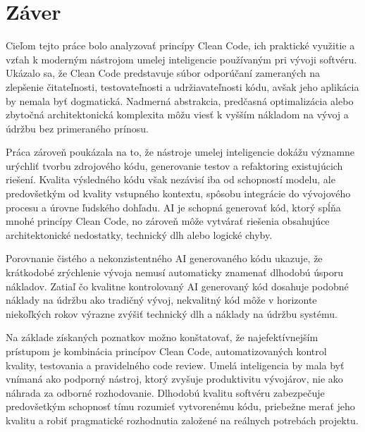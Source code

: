\section{Záver}

Cieľom tejto práce bolo analyzovať princípy Clean Code, ich praktické využitie a vzťah k moderným nástrojom umelej inteligencie používaným pri vývoji softvéru. Ukázalo sa, že Clean Code predstavuje súbor odporúčaní zameraných na zlepšenie čitateľnosti, testovateľnosti a udržiavateľnosti kódu, avšak jeho aplikácia by nemala byť dogmatická. Nadmerná abstrakcia, predčasná optimalizácia alebo zbytočná architektonická komplexita môžu viesť k vyšším nákladom na vývoj a údržbu bez primeraného prínosu.

Práca zároveň poukázala na to, že nástroje umelej inteligencie dokážu významne urýchliť tvorbu zdrojového kódu, generovanie testov a refaktoring existujúcich riešení. Kvalita výsledného kódu však nezávisí iba od schopností modelu, ale predovšetkým od kvality vstupného kontextu, spôsobu integrácie do vývojového procesu a úrovne ľudského dohľadu. AI je schopná generovať kód, ktorý spĺňa mnohé princípy Clean Code, no zároveň môže vytvárať riešenia obsahujúce architektonické nedostatky, technický dlh alebo logické chyby.

Porovnanie čistého a nekonzistentného AI generovaného kódu ukazuje, že krátkodobé zrýchlenie vývoja nemusí automaticky znamenať dlhodobú úsporu nákladov. Zatiaľ čo kvalitne kontrolovaný AI generovaný kód dosahuje podobné náklady na údržbu ako tradičný vývoj, nekvalitný kód môže v horizonte niekoľkých rokov výrazne zvýšiť technický dlh a náklady na údržbu systému.

Na základe získaných poznatkov možno konštatovať, že najefektívnejším prístupom je kombinácia princípov Clean Code, automatizovaných kontrol kvality, testovania a pravidelného code review. Umelá inteligencia by mala byť vnímaná ako podporný nástroj, ktorý zvyšuje produktivitu vývojárov, nie ako náhrada za odborné rozhodovanie. Dlhodobú kvalitu softvéru zabezpečuje predovšetkým schopnosť tímu rozumieť vytvorenému kódu, priebežne merať jeho kvalitu a robiť pragmatické rozhodnutia založené na reálnych potrebách projektu.
